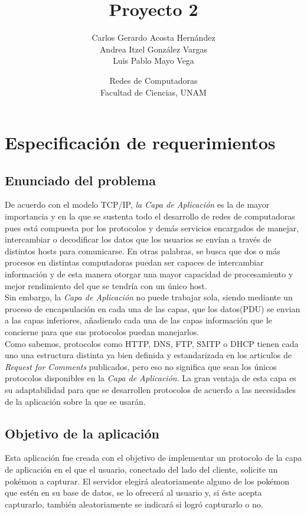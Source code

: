 \documentclass[12pt]{article}
\title{Proyecto 2}
\author{Carlos Gerardo Acosta Hernández \\ Andrea Itzel González Vargas \\ Luis Pablo Mayo Vega}
\date{Redes de Computadoras\\Facultad de Ciencias, UNAM}
\begin{document}
\maketitle
\tableofcontents
\newpage
\section{Especificación de requerimientos}
\subsection{Enunciado del problema}
De acuerdo con el modelo TCP/IP, \textit{la Capa de Aplicación} es la de mayor importancia y en la que se sustenta todo el desarrollo de redes de computadoras pues está compuesta por los protocolos y demás servicios encargados de manejar, intercambiar o decodificar los datos que los usuarios se envían a través de distintos hosts para comunicarse. En otras palabras, se busca que dos o más procesos en distintas computadoras puedan ser capaces de intercambiar información y de esta manera otorgar una mayor capacidad de procesamiento y mejor rendimiento del que se tendría con un único host.\\

Sin embargo, la \textit{Capa de Aplicación} no puede trabajar sola, siendo mediante un proceso de encapsulación en cada una de las capas, que los datos(PDU) se envian a las capas inferiores, añadiendo cada una de las capas información que le concierne para que sus protocolos puedan manejarlos.\\

Como sabemos, protocolos como \textsf{HTTP, DNS, FTP, SMTP o DHCP} tienen cada uno una estructura distinta ya bien definida y estandarizada en los articulos de \textit{Request for Comments} publicados, pero eso no significa que sean los únicos protocolos disponibles en la \textit{Capa de Aplicación}. La gran ventaja de esta capa es su adaptabilidad para que se desarrollen protocolos de acuerdo a las necesidades de la aplicación sobre la que se usarán. 

\subsection{Objetivo de la aplicación}

Esta aplicación fue creada con el objetivo de implementar un protocolo de la capa de aplicación en el que el usuario, conectado del lado del cliente, solicite un pokémon a capturar. El servidor elegirá aleatoriamente alguno de los pokémon que estén en su base de datos, se lo ofrecerá al usuario y, si éste acepta capturarlo, también aleatoriamente se indicará
 si logró capturarlo o no. \\
\end{document}
